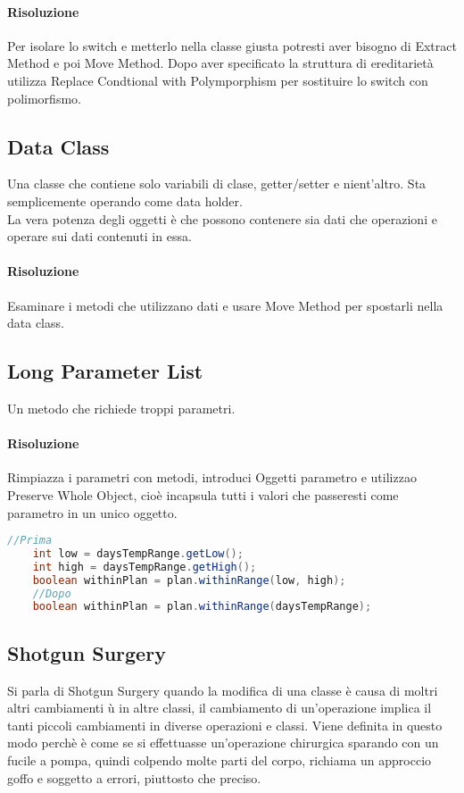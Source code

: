 \paragraph*{Risoluzione} Per isolare lo switch e metterlo nella classe giusta potresti aver
bisogno di Extract Method e poi Move Method. Dopo aver specificato la struttura di ereditarietà utilizza
Replace Condtional with Polymporphism per sostituire lo switch con polimorfismo.
\subsection{Data Class}
Una classe che contiene solo variabili di clase, getter/setter e nient'altro. Sta
semplicemente operando come data holder.\\
La vera potenza degli oggetti è che possono contenere sia dati che operazioni e operare
sui dati contenuti in essa.
\paragraph*{Risoluzione} Esaminare i metodi che utilizzano dati e usare Move Method per spostarli
nella data class.
\subsection{Long Parameter List}
Un metodo che richiede troppi parametri.\\
\paragraph*{Risoluzione} Rimpiazza i parametri con metodi, introduci Oggetti parametro e
utilizzao Preserve Whole Object, cioè incapsula tutti i valori che passeresti come parametro
in un unico oggetto.
\begin{lstlisting}[language=java]
    //Prima
    int low = daysTempRange.getLow();
    int high = daysTempRange.getHigh();
    boolean withinPlan = plan.withinRange(low, high);
    //Dopo
    boolean withinPlan = plan.withinRange(daysTempRange);
\end{lstlisting}
\subsection{Shotgun Surgery}
Si parla di Shotgun Surgery quando la modifica di una classe è causa di moltri altri cambiamenti ù
in altre classi, il cambiamento di un'operazione implica il tanti piccoli cambiamenti in
diverse operazioni e classi. Viene definita in questo modo perchè è come se si effettuasse un'operazione 
chirurgica sparando con un fucile a pompa, quindi colpendo molte parti del corpo, richiama un approccio
goffo e soggetto a errori, piuttosto che preciso.

